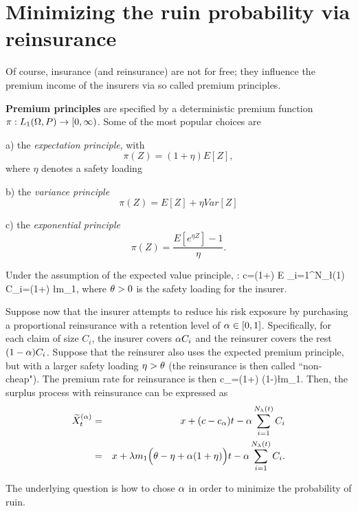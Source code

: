\section{Minimizing the ruin probability via reinsurance}
Of course, insurance (and  reinsurance) are not for free; they influence the  premium income of the  insurers  via so called premium principles.

{\bf Premium principles} are specified by a deterministic
premium function $\pi : L_1 (\Omega, P) \to [0,\infty)$. Some of the most popular choices are

a) the \textit{expectation principle},   with
$$\pi (Z) = (1 + \eta)E[Z],$$
where $\eta $ denotes a safety loading %

b) the \textit{variance principle}
$$\pi (Z) = E[Z] + \eta Var [Z]$$ %

c) the \textit{exponential principle}
$$\pi (Z) = \frac{E[e^{\eta Z}]-1}{\eta}.$$

Under the assumption of the expected
value principle, \ith:
\bea c=(1+\th) E \sum_{i=1}^{N_\l(1)} C_i=(1+\th) \l m_1,\eea
where $\theta > 0$ is the safety loading for the insurer. 

Suppose now that the insurer attempts to reduce his risk exposure by purchasing a proportional reinsurance
with a retention level of $\alpha \in [0, 1]$. Specifically, for each claim of size $C_i$, the insurer covers $\alpha C_i$ and the reinsurer
covers the rest $(1-\alpha) C_i$.
 Suppose that the reinsurer also uses the expected premium principle, but with a larger
safety loading $\eta >\theta$ (the reinsurance is then called ``non-cheap").  The premium rate for reinsurance is then
\bea c_\a =(1+\eta) (1-\a)\l m_1.\eea
Then, the surplus process with reinsurance can be expressed as
\begin{eqnarray*} \la{CLr}
\T X^{(\a)}_t &=& x + (c-c_\a) t  - \a \sum_{i=1}^{N_\lambda (t)} C_i\\&=& x + \l m_1\Big( \th -\eta+ \a(1+\eta)\Big) t  - \a \sum_{i=1}^{N_\lambda (t)} C_i.
\end{eqnarray*}

The underlying question is how to chose $\alpha$ in order to minimize the probability of ruin.
